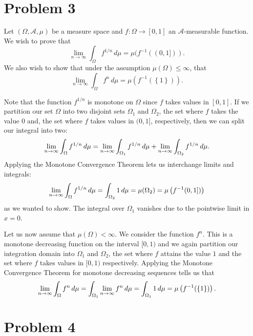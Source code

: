\documentclass[a4paper, 10pt]{amsart}
\begin{document}
\section*{Problem 3} \noindent Let $(\Omega, \mathcal{A}, \mu)$ be a measure
space and $f : \Omega \to \left[ 0, 1 \right]$ an $\mathcal{A}$-measurable
function. We wish to prove that $$ \lim_{n\to\infty}\int_\Omega f^{1/n} \, d\mu
= \mu(f^{-1}((0, 1])).$$ We also wish to show that under the assumption
$\mu(\Omega) \le \infty$, that $$ \lim_{n\to\infty} \int_\Omega f^n \, d\mu =
\mu \left( f^{-1}(\left\{1 \right\}) \right).$$

Note that the function $f^{1/n}$ is monotone on $\Omega$ since $f$ takes values
in $[0, 1]$. If we partition our set $\Omega$ into two disjoint sets $\Omega_1$
and $\Omega_2$, the set where $f$ takes the value $0$ and, the set where $f$
takes values in $(0, 1]$, respectively, then we can split our integral into
two:
\begin{equation}
  \notag
  \lim_{n\to\infty} \int_\Omega f^{1/n}\, d\mu = \lim_{n\to\infty} \int_{\Omega_1} f^{1/n} \, d\mu + \lim_{n\to\infty} \int_{\Omega_2} f^{1/n} \, d\mu.
\end{equation}
Applying the Monotone Convergence Theorem lets us interchange limits and
integrals:
\begin{equation}
  \notag
\lim_{n\to\infty} \int_\Omega f^{1/n}\, d\mu = \int_{\Omega_2} 1 \, d\mu = \mu(\Omega_2) = \mu \left( f^{-1}(0, 1]) \right)
\end{equation}
as we wanted to show. The integral over $\Omega_1$ vanishes due to the
pointwise limit in $x = 0$.

Let us now assume that $\mu(\Omega) < \infty$. We consider the function $f^n$.
This is a monotone decreasing function on the interval $[0, 1)$ and we again
partition our integration domain into $\Omega_1$ and $\Omega_2$, the set
where $f$ attains the value $1$ and the set where $f$ takes values in $[0,1)$ respectively.
Applying the Monotone Convergence Theorem for monotone decreasing sequences tells us that
\begin{equation}
  \notag
  \lim_{n\to\infty} \int_\Omega f^n \, d\mu = \int_{\Omega_1} \lim_{n\to\infty} f^n \, d\mu = \int_{\Omega_1} 1 \, d\mu = \mu \left( f^{-1}(\left\{ 1 \right\})\right).
\end{equation}

\section*{Problem 4}
\end{document}
